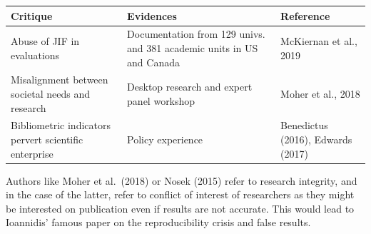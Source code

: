 \documentclass[]{elsarticle} %
\begin{document}
\begin{longtable}[]{@{}lll@{}}
\toprule
\begin{minipage}[b]{0.29\columnwidth}\raggedright
Critique\strut
\end{minipage} & \begin{minipage}[b]{0.32\columnwidth}\raggedright
Evidences\strut
\end{minipage} & \begin{minipage}[b]{0.29\columnwidth}\raggedright
Reference\strut
\end{minipage}\tabularnewline
\midrule
\endhead
\begin{minipage}[t]{0.29\columnwidth}\raggedright
Abuse of JIF in evaluations\strut
\end{minipage} & \begin{minipage}[t]{0.32\columnwidth}\raggedright
Documentation from 129 univs. and 381 academic units in US and
Canada\strut
\end{minipage} & \begin{minipage}[t]{0.29\columnwidth}\raggedright
McKiernan et al., 2019\strut
\end{minipage}\tabularnewline
\begin{minipage}[t]{0.29\columnwidth}\raggedright
Misalignment between societal needs and research\strut
\end{minipage} & \begin{minipage}[t]{0.32\columnwidth}\raggedright
Desktop research and expert panel workshop\strut
\end{minipage} & \begin{minipage}[t]{0.29\columnwidth}\raggedright
Moher et al., 2018\strut
\end{minipage}\tabularnewline
\begin{minipage}[t]{0.29\columnwidth}\raggedright
Bibliometric indicators pervert scientific enterprise\strut
\end{minipage} & \begin{minipage}[t]{0.32\columnwidth}\raggedright
Policy experience\strut
\end{minipage} & \begin{minipage}[t]{0.29\columnwidth}\raggedright
Benedictus (2016), Edwards (2017)\strut
\end{minipage}\tabularnewline
\bottomrule
\end{longtable}

Authors like Moher et al.~(2018) or Nosek (2015) refer to research
integrity, and in the case of the latter, refer to conflict of interest
of researchers as they might be interested on publication even if
results are not accurate. This would lead to Ioannidis' famous paper on
the reproducibility crisis and false results.
\end{document}
